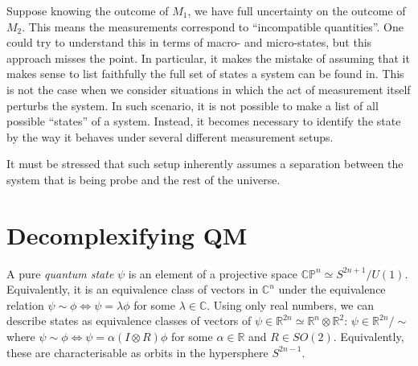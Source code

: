 \documentclass[a4paper]{report}
\newcommand{\CC}{\mathbb{C}}
\newcommand{\RR}{\mathbb{R}}
\begin{document}
Suppose knowing the outcome of $M_1$, we have full uncertainty on the outcome of $M_2$. This means the measurements correspond to ``incompatible quantities''.
One could try to understand this in terms of macro- and micro-states, but this approach misses the point. In particular, it makes the mistake of assuming that it makes sense to list faithfully the full set of states a system can be found in.
This is not the case when we consider situations in which the act of measurement itself perturbs the system.
In such scenario, it is not possible to make a list of all possible ``states'' of a system. Instead, it becomes necessary to identify the state by the way it behaves under several different measurement setups.

It must be stressed that such setup inherently assumes a separation between the system that is being probe and the rest of the universe.

\section{Decomplexifying QM}
A pure \emph{quantum state} $\psi$ is an element of a projective space $\mathbb{CP}^n\simeq S^{2n+1}/U(1)$.
Equivalently, it is an equivalence class of vectors in $\CC^{n}$ under the equivalence relation $\psi\sim\phi\Longleftrightarrow \psi=\lambda\phi$ for some $\lambda\in\CC$.
Using only real numbers, we can describe states as equivalence classes of vectors of $\psi\in\RR^{2n}\simeq \RR^n\otimes\RR^2$: $\psi\in\RR^{2n}\!/\!\sim$ where $\psi\sim\phi\Longleftrightarrow \psi=\alpha(I\otimes R)\phi$ for some $\alpha\in\RR$ and $R\in SO(2)$.
Equivalently, these are characterisable as orbits in the hypersphere $S^{2n-1}$.
\end{document}
